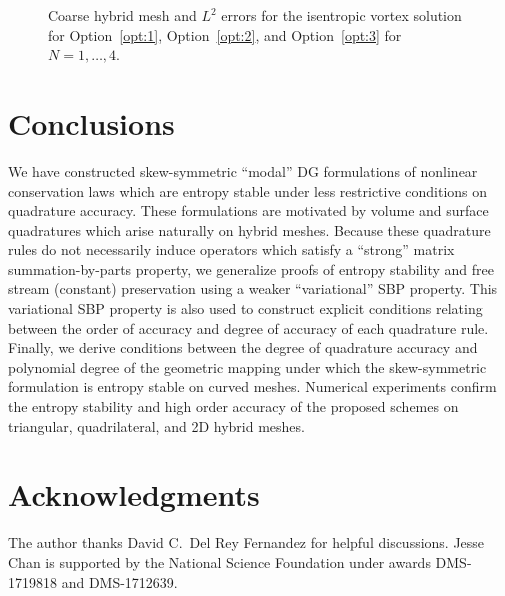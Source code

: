 \documentclass{svjour3}                     %
\begin{document}
\begin{figure}
{
}
\caption{Coarse hybrid mesh and  $L^2$ errors for the isentropic vortex solution for Option~\ref{opt:1}, Option~\ref{opt:2}, and Option~\ref{opt:3} for $N = 1,\ldots, 4$.}
\label{fig:hybriderrors}
\end{figure}

\section{Conclusions}

We have constructed skew-symmetric ``modal'' DG formulations of nonlinear conservation laws which are entropy stable under less restrictive conditions on quadrature accuracy.  These formulations are motivated by volume and surface quadratures which arise naturally on hybrid meshes.  Because these quadrature rules do not necessarily induce operators which satisfy a ``strong'' matrix summation-by-parts property, we generalize proofs of entropy stability and free stream (constant) preservation using a weaker ``variational'' SBP property.  This variational SBP property is also used to construct explicit conditions relating between the order of accuracy and degree of accuracy of each quadrature rule.  Finally, we derive conditions between the degree of quadrature accuracy and polynomial degree of the geometric mapping under which the skew-symmetric formulation is entropy stable on curved meshes.  Numerical experiments confirm the entropy stability and high order accuracy of the proposed schemes on triangular, quadrilateral, and 2D hybrid meshes.  

\section{Acknowledgments} 

The author thanks David C.\ Del Rey Fernandez for helpful discussions.  Jesse Chan is supported by the National Science Foundation under awards DMS-1719818 and DMS-1712639.  
\end{document}
